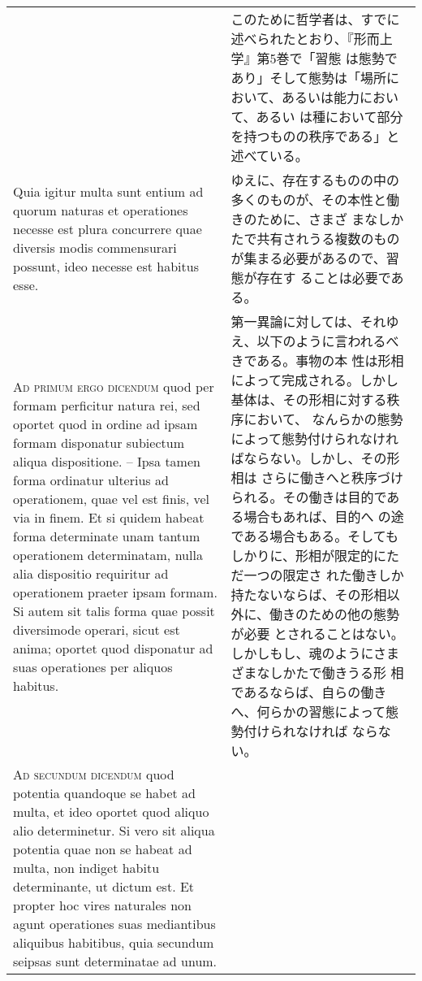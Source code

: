 \documentclass[10pt]{jsarticle} %
\begin{document}
\begin{longtable}{p{21em}p{21em}}
&

このために哲学者は、すでに述べられたとおり、『形而上学』第5巻で「習態
は態勢であり」そして態勢は「場所において、あるいは能力において、あるい
は種において部分を持つものの秩序である」と述べている。

\\

Quia igitur multa sunt entium ad quorum naturas et
operationes necesse est plura concurrere quae diversis modis
commensurari possunt, ideo necesse est habitus esse.

&

ゆえに、存在するものの中の多くのものが、その本性と働きのために、さまざ
まなしかたで共有されうる複数のものが集まる必要があるので、習態が存在す
ることは必要である。

\\


{\scshape Ad primum ergo dicendum} quod per formam perficitur natura rei, sed
oportet quod in ordine ad ipsam formam disponatur subiectum aliqua
dispositione. -- Ipsa tamen forma ordinatur ulterius ad operationem, quae
vel est finis, vel via in finem. Et si quidem habeat forma determinate
unam tantum operationem determinatam, nulla alia dispositio requiritur
ad operationem praeter ipsam formam. Si autem sit talis forma quae
possit diversimode operari, sicut est anima; oportet quod disponatur
ad suas operationes per aliquos habitus.

&

第一異論に対しては、それゆえ、以下のように言われるべきである。事物の本
性は形相によって完成される。しかし基体は、その形相に対する秩序において、
なんらかの態勢によって態勢付けられなければならない。しかし、その形相は
さらに働きへと秩序づけられる。その働きは目的である場合もあれば、目的へ
の途である場合もある。そしてもしかりに、形相が限定的にただ一つの限定さ
れた働きしか持たないならば、その形相以外に、働きのための他の態勢が必要
とされることはない。しかしもし、魂のようにさまざまなしかたで働きうる形
相であるならば、自らの働きへ、何らかの習態によって態勢付けられなければ
ならない。

\\



{\scshape Ad secundum dicendum} quod potentia
quandoque se habet ad multa, et ideo oportet quod aliquo alio
determinetur. Si vero sit aliqua potentia quae non se habeat ad multa,
non indiget habitu determinante, ut dictum est. Et propter hoc vires
naturales non agunt operationes suas mediantibus aliquibus habitibus,
quia secundum seipsas sunt determinatae ad unum.


\end{longtable}
\end{document}
